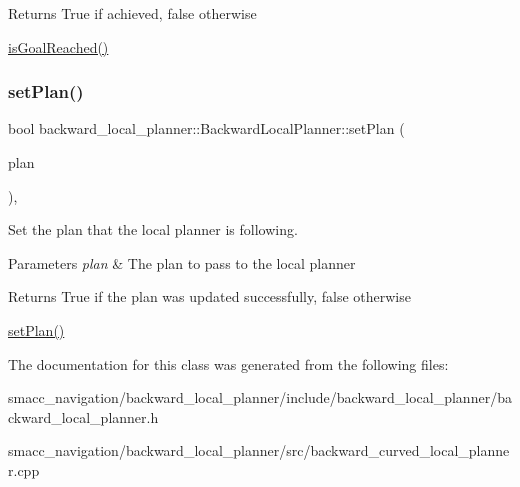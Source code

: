 \begin{DoxyReturn}{Returns}
True if achieved, false otherwise
\end{DoxyReturn}
\hyperlink{classbackward__local__planner_1_1BackwardLocalPlanner_a63beb009f6c230d133ba34b16ce0b189}{is\+Goal\+Reached()} \mbox{\label{classbackward__local__planner_1_1BackwardLocalPlanner_ad2f7c554f1e107a58ac650d377646f27}} 
\subsubsection{\texorpdfstring{set\+Plan()}{setPlan()}}
{\footnotesize\ttfamily bool backward\+\_\+local\+\_\+planner\+::\+Backward\+Local\+Planner\+::set\+Plan (\begin{DoxyParamCaption}\item[{const std\+::vector$<$ geometry\+\_\+msgs\+::\+Pose\+Stamped $>$ \&}]{plan }\end{DoxyParamCaption})\hspace{0.3cm}{\ttfamily [override]}, {\ttfamily [virtual]}}



Set the plan that the local planner is following. 


\begin{DoxyParams}{Parameters}
{\em plan} & The plan to pass to the local planner \\
\hline
\end{DoxyParams}
\begin{DoxyReturn}{Returns}
True if the plan was updated successfully, false otherwise
\end{DoxyReturn}
\hyperlink{classbackward__local__planner_1_1BackwardLocalPlanner_ad2f7c554f1e107a58ac650d377646f27}{set\+Plan()} 

The documentation for this class was generated from the following files\+:\begin{DoxyCompactItemize}
\item 
smacc\+\_\+navigation/backward\+\_\+local\+\_\+planner/include/backward\+\_\+local\+\_\+planner/backward\+\_\+local\+\_\+planner.\+h\item 
smacc\+\_\+navigation/backward\+\_\+local\+\_\+planner/src/backward\+\_\+curved\+\_\+local\+\_\+planner.\+cpp\end{DoxyCompactItemize}
